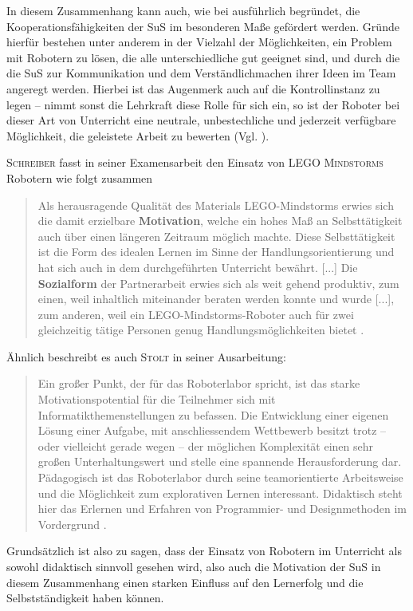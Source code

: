 \documentclass[paper=a4, pagesize, DIV=calc, BCOR=15.5mm, twoside=on, onecolumn=on, open = right, titlepage =on, parskip =half-, headsepline = on, footsepline = on, chapterprefix = on, appendixprefix = off, fontsize = 12pt, numbers = noenddot, abstract = on]{scrbook}
\numberwithin{equation}{chapter}
\theoremstyle{definition}
\theoremstyle{plain}
\theoremstyle{plain}
\theoremstyle{remark}
\theoremstyle{plain}
\theoremstyle{plain}
\begin{document}
In diesem Zusammenhang kann auch, wie bei \cite{wagner:05} ausführlich begründet, die Kooperationsfähigkeiten der SuS im besonderen Maße gefördert werden. Gründe hierfür bestehen unter anderem in der Vielzahl der Möglichkeiten, ein Problem mit Robotern zu lösen, die alle unterschiedliche gut geeignet sind, und durch die die SuS zur Kommunikation und dem Verständlichmachen ihrer Ideen im Team angeregt werden. Hierbei ist das Augenmerk auch auf die Kontrollinstanz zu legen -- nimmt sonst die Lehrkraft diese Rolle für sich ein, so ist der Roboter bei dieser Art von Unterricht eine neutrale, unbestechliche und jederzeit verfügbare Möglichkeit, die geleistete Arbeit zu bewerten (Vgl. \cite[S.6f.]{wagner:05}).

\textsc{Schreiber} fasst in seiner Examensarbeit den Einsatz von \textsc{LEGO Mindstorms} Robotern wie folgt zusammen
\begin{quote}
Als herausragende Qualität des Materials LEGO-Mindstorms erwies sich die damit erzielbare \textbf{Motivation}, welche ein hohes Maß an Selbsttätigkeit auch über einen längeren Zeitraum möglich machte. Diese Selbsttätigkeit ist die Form des idealen Lernen im Sinne der Handlungsorientierung und hat sich auch in dem durchgeführten Unterricht bewährt. [...] Die \textbf{Sozialform} der Partnerarbeit erwies sich als weit gehend produktiv, zum einen, weil inhaltlich miteinander beraten werden konnte und wurde [...], zum anderen, weil ein LEGO-Mindstorms-Roboter auch für zwei gleichzeitig tätige Personen genug Handlungsmöglichkeiten bietet \cite[S.47f.]{schreiber:04}.
\end{quote}
Ähnlich beschreibt es auch \textsc{Stolt} in seiner Ausarbeitung:
\begin{quote}
Ein großer Punkt, der für das Roboterlabor spricht, ist das starke Motivationspotential für die Teilnehmer sich mit Informatikthemenstellungen zu befassen. Die Entwicklung einer eigenen Lösung einer Aufgabe, mit anschliessendem Wettbewerb besitzt trotz – oder vielleicht gerade wegen – der möglichen Komplexität einen sehr großen Unterhaltungswert und stelle eine spannende Herausforderung dar. Pädagogisch ist das Roboterlabor durch seine teamorientierte Arbeitsweise und die Möglichkeit zum explorativen Lernen interessant. Didaktisch steht hier das Erlernen und Erfahren von Programmier- und Designmethoden im Vordergrund \cite[S.5f.]{stolt:01}.
\end{quote}

Grundsätzlich ist also zu sagen, dass der Einsatz von Robotern im Unterricht als sowohl didaktisch sinnvoll gesehen wird, also auch die Motivation der SuS in diesem Zusammenhang einen starken Einfluss auf den Lernerfolg und die Selbstständigkeit haben können.%
\end{document}
